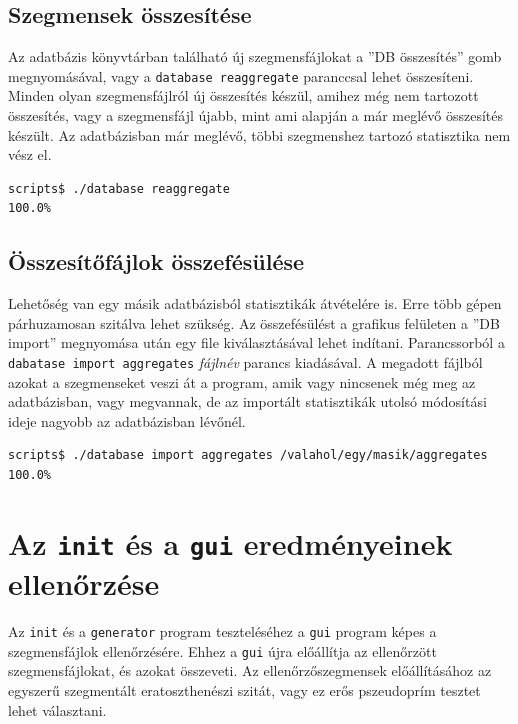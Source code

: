 \subsection{Szegmensek összesítése}

Az adatbázis könyvtárban található új szegmensfájlokat a ''DB összesítés'' gomb megnyomásával, vagy a \texttt{database reaggregate} paranccsal lehet összesíteni.
Minden olyan szegmensfájlról új összesítés készül, amihez még nem tartozott összesítés, vagy a szegmensfájl újabb, mint ami alapján a már meglévő összesítés készült.
Az adatbázisban már meglévő, többi szegmenshez tartozó statisztika nem vész el.

\begin{lstlisting}[language=bash]
scripts$ ./database reaggregate
100.0%
\end{lstlisting}

\subsection{Összesítőfájlok összefésülése}

Lehetőség van egy másik adatbázisból statisztikák átvételére is.
Erre több gépen párhuzamosan szitálva lehet szükség.
Az összefésülést a grafikus felületen a ''DB import'' megnyomása után egy file kiválasztásával lehet indítani.
Parancssorból a \texttt{dabatase import aggregates} \textit{fájlnév} parancs kiadásával.
A megadott fájlból azokat a szegmenseket veszi át a program, amik vagy nincsenek még meg az adatbázisban, vagy megvannak, de az importált statisztikák utolsó módosítási ideje nagyobb az adatbázisban lévőnél.

\begin{lstlisting}[language=bash]
scripts$ ./database import aggregates /valahol/egy/masik/aggregates
100.0%
\end{lstlisting}

\section{Az \texttt{init} és a \texttt{gui} eredményeinek ellenőrzése}

Az \texttt{init} és a \texttt{generator} program teszteléséhez a \texttt{gui} program képes a szegmensfájlok ellenőrzésére.
Ehhez a \texttt{gui} újra előállítja az ellenőrzött szegmensfájlokat, és azokat összeveti.
Az ellenőrzőszegmensek előállításához az egyszerű szegmentált eratoszthenészi szitát, vagy ez erős pszeudoprím tesztet lehet választani.

